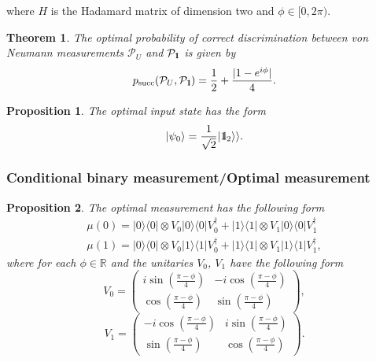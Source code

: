 \documentclass[preprint,12pt, a4paper]{elsarticle}
\newcommand{\ket}[1]{\ensuremath{|#1\rangle}}
\newcommand{\bra}[1]{\ensuremath{\langle#1|}}
\newcommand{\ketbra}[2]{\ensuremath{\ket{#1}\bra{#2}}}
\newcommand{\proj}[1]{\ensuremath{\ketbra{#1}{#1}}}
\newcommand{\1}{{\rm 1\hspace{-0.9mm}l}}
\newcommand{\Id}{{\rm 1\hspace{-0.9mm}l}}
\newcommand{\PP}{\mathcal{P}}
\newtheorem{theorem}{Theorem}
\newtheorem{proposition}{Proposition}
\begin{document}
where $H$ is the Hadamard matrix of dimension two and $\phi \in [0, 2 \pi)$.

\begin{theorem}
The optimal probability of correct discrimination between von Neumann
measurements $\PP_U$ and $\PP_{\Id}$ is given by
\begin{equation}
p_{\text{succ}}(\PP_{U}, \PP_{\Id}) = \frac{1}{2} + \frac{|1 - e^{i \phi}  |}{4} .
\end{equation}
\end{theorem}

\begin{proposition}\label{prop-discrim}
 The optimal input state has the form
\begin{equation}
\ket{\psi_{0}} = \frac{1}{\sqrt{2}} |\Id_2 \rangle \rangle.
\end{equation}
\end{proposition}

\subsubsection{Conditional binary measurement/Optimal measurement}\label{sec_example_final_measurement}

\begin{proposition}
The  optimal measurement has the following form
\begin{equation}
\begin{split}
\mu(0) = \proj{0} \otimes V_0 \proj{0} V_0^\dagger +  \proj{1} \otimes V_1
\proj{0} V_1^\dagger  \\
\mu(1) = \proj{0} \otimes V_0 \proj{1} V_0^\dagger +  \proj{1} \otimes V_1
\proj{1} V_1^\dagger,
\end{split}
\end{equation}
where for each $\phi \in \mathbb{R}$ and  the unitaries $V_0$,  $V_1$
have the following form
\begin{equation}
V_0 = \left(\begin{array}{cc}i \sin\left( \frac{\pi - \phi}{4} \right)&-i
\cos\left( \frac{\pi - \phi}{4} \right)\\ \cos\left( \frac{\pi -
\phi}{4}\right)& \sin\left( \frac{\pi - \phi}{4} \right)\end{array}\right),
\end{equation}
\begin{equation}
V_1 = \left(\begin{array}{cc}-i \cos\left(\frac{\pi - \phi}{4}\right) &i
\sin\left( \frac{\pi - \phi}{4}\right)\\\sin\left( \frac{\pi - \phi}{4} \right)
&  \cos\left( \frac{\pi - \phi}{4} \right) \end{array}\right).
\end{equation}
\end{proposition}
\end{document}
